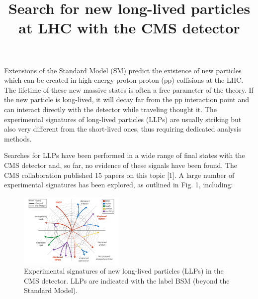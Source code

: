 \documentclass[twocolumn,twoside,10pt,nodate]{article}
\newcommand{\titolo}[2]{\title{\Large\bf\vspace{-1cm}#1}}
\begin{document}

\titolo{Search for new long-lived particles at LHC with the CMS detector}

\date{}%
\maketitle
\thispagestyle{fancy} %

Extensions of the Standard Model (SM) predict the existence of new
particles which can be created in high-energy proton-proton (pp) 
collisions at the LHC. The lifetime of these new massive states is
often a free parameter of the theory. 
If the new particle is long-lived, it will decay far from the pp
interaction point and can interact directly with the detector while
traveling thought it. The experimental signatures of long-lived
particles (LLPs) are usually striking but also very different from 
the short-lived ones, thus requiring dedicated analysis methods.

Searches for LLPs have been performed in a
wide range of final states with the CMS detector 
and, so far, no evidence of these signals have been found.
The CMS collaboration published 
15 papers on this topic [1]. A large number of experimental 
signatures has been explored, as outlined in Fig. 1, including:

\begin{figure}[h]
\centering
\includegraphics[width=0.45\textwidth,angle=0]{santanastasio_fig1.pdf}
\caption{\small Experimental signatures of new long-lived particles (LLPs) 
in the CMS detector. LLPs are indicated with the label BSM (beyond the Standard Model).} %
\end{figure}
\end{document}
